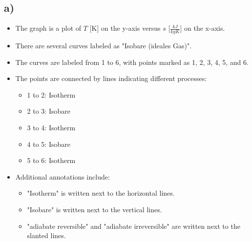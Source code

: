 

\subsection*{a)}

\begin{itemize}
    \item The graph is a plot of \( T \) [K] on the y-axis versus \( s \) [\(\frac{kJ}{kgK}\)] on the x-axis.
    \item There are several curves labeled as "Isobare (ideales Gas)".
    \item The curves are labeled from 1 to 6, with points marked as 1, 2, 3, 4, 5, and 6.
    \item The points are connected by lines indicating different processes:
        \begin{itemize}
            \item 1 to 2: Isotherm
            \item 2 to 3: Isobare
            \item 3 to 4: Isotherm
            \item 4 to 5: Isobare
            \item 5 to 6: Isotherm
        \end{itemize}
    \item Additional annotations include:
        \begin{itemize}
            \item "Isotherm" is written next to the horizontal lines.
            \item "Isobare" is written next to the vertical lines.
            \item "adiabate reversible" and "adiabate irreversible" are written next to the slanted lines.
        \end{itemize}
\end{itemize}